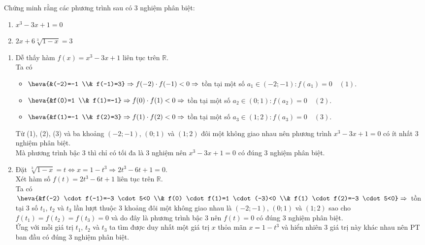 \begin{vd}%
	Chứng minh rằng các phương trình sau có $3$ nghiệm phân biệt:
	\begin{enumerate}
		\item $x^3-3 x+1=0$
		\item $2 x+6 \sqrt[3]{1-x}=3$
	\end{enumerate}
	\loigiai
	{\begin{enumerate}
			\item Dễ thấy hàm $f(x)=x^3-3 x+1$ liên tục trên $\mathbb{R}$.\\
			Ta có
			\begin{itemize}
				\item  $\heva{&(-2)=-1 \\& f(-1)=3} \Rightarrow f(-2) \cdot f(-1)<0\\ \Rightarrow$ tồn tại một số $a_1 \in(-2 ;-1): f(a_1)=0\quad(1)$.
				\item $\heva{&f(0)=1 \\& f(1)=-1} \Rightarrow f(0) \cdot f(1)<0 \Rightarrow$ tồn tại một số $a_2 \in(0 ; 1): f\left(a_2\right)=0\quad(2)$.
				\item $\heva{&f(1)=-1 \\& f(2)=3} \Rightarrow f(1) \cdot f(2)<0 \Rightarrow$ tồn tại một số $a_3 \in(1 ; 2): f\left(a_3\right)=0\quad(3)$.
			\end{itemize}
			Từ (1), (2), (3) và ba khoảng $(-2 ;-1)$, $(0 ; 1)$ và $(1 ; 2)$ đôi một không giao nhau nên phương trình $x^3-3 x+1=0$ có ít nhất $3$ nghiệm phân biệt.\\
			Mà phương trình bậc $3$ thì chỉ có tối đa là $3$ nghiệm nên $x^3-3 x+1=0$ có đúng $3$ nghiệm phân biệt.
			\item  Đặt $\sqrt[3]{1-x}=t \Leftrightarrow x=1-t^3 \Rightarrow 2 t^3-6 t+1=0$.\\
			Xét hàm số $f(t)=2 t^3-6 t+1$ liên tục trên $\mathbb{R}$.\\
			Ta có $\heva{&f(-2) \cdot f(-1)=-3 \cdot 5<0 \\& f(0) \cdot f(1)=1 \cdot(-3)<0 \\& f(1) \cdot f(2)=-3 \cdot 5<0} \Rightarrow$ tồn tại $3$ số $t_1$, $t_2$ và $t_3$ lần lượt thuộc $3$ khoảng đôi một không giao nhau là $(-2 ;-1)$, $(0 ; 1)$ và $(1 ; 2)$ sao cho $f\left(t_1\right)=f\left(t_2\right)=f\left(t_3\right)=0$ và do đây là phương trình bậc $3$ nên $f(t)=0$ có đúng $3$ nghiệm phân biệt.\\
			Ứng với mỗi giá trị $t_1$, $t_2$ và $t_3$ ta tìm được duy nhất một giá trị $x$ thỏa mãn $x=1-t^3$ và hiển nhiên $3$ giá trị này khác nhau nên PT ban đầu có đúng $3$ nghiệm phân biệt.	
		\end{enumerate}
	}
\end{vd}


